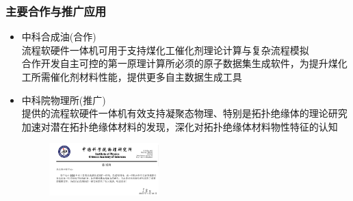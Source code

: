 \begin{frame}
	\frametitle{主要合作与推广应用}
	\begin{itemize}
	 \setlength{\itemsep}{10pt}
		\item 中科合成油(合作)\\
		流程软硬件一体机可用于支持煤化工催化剂理论计算与复杂流程模拟\\
		合作开发自主可控的第一原理计算所必须的原子数据集生成软件，为提升煤化工所需催化剂材料性能，提供更多自主数据生成工具
		\item 中科院物理所(推广)\\
		提供的流程软硬件一体机有效支持凝聚态物理、特别是拓扑绝缘体的理论研究\\
		加速对潜在拓扑绝缘体材料的发现，深化对拓扑绝缘体材料物性特征的认知
\begin{figure}[h!]
\centering
\vskip -5pt
\includegraphics[height=0.8in]{Figures/Acknowledge-IP_CAS.png}
\label{Acknowleges-IP_CAS}
\end{figure}
	\end{itemize}
\end{frame}


